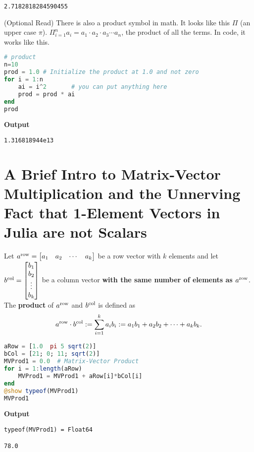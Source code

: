 \begin{tcolorbox}[title=\textbf{The summation symbol is a for loop and vice versa}]
\begin{itemize}
\begin{verbatim}
2.7182818284590455
\end{verbatim}
  
    
\end{itemize}

\end{tcolorbox} 

\begin{rem} (Optional Read) There is also a product symbol in math. It looks like this $\Pi$ (an upper case $\pi$). $\Pi_{i=1}^{n} a_i = a_1 \cdot a_2 \cdot a_3 \cdots a_n$, the product of all the terms. In code, it works like this.\\

\begin{lstlisting}[language=Julia,style=mystyle]
# product
n=10
prod = 1.0 # Initialize the product at 1.0 and not zero
for i = 1:n
    ai = i^2       # you can put anything here
    prod = prod * ai 
end
prod
\end{lstlisting}
\textbf{Output} 
\begin{verbatim}
1.316818944e13
\end{verbatim}

\end{rem}

\section{A Brief Intro to Matrix-Vector Multiplication and the Unnerving Fact that 1-Element Vectors in Julia are not Scalars}

Let $a^{\rm row}=\begin{bmatrix} a_1 & a_2 & \cdots & a_k \end{bmatrix}$ be a row vector with $k$ elements and let $b^{\rm col}= \begin{bmatrix} b_1 \\b_2 \\ \vdots \\b_k \end{bmatrix}$ be a column vector \textbf{with the same number of elements as $a^{\rm row}$}. The \textbf{product} of $a^{\rm row}$ and $b^{\rm col}$ is defined as 
\begin{equation}
\label{eq:VectorProductFormula}
    a^{\rm row} \cdot b^{\rm col}:= \sum_{i=1}^k a_i b_i := a_1 b_1 + a_2 b_2 + \cdots + a_k b_k.
\end{equation}


\begin{lstlisting}[language=Julia,style=mystyle]
aRow = [1.0  pi 5 sqrt(2)]
bCol = [21; 0; 11; sqrt(2)]
MVProd1 = 0.0  # Matrix-Vector Product 
for i = 1:length(aRow)
    MVProd1 = MVProd1 + aRow[i]*bCol[i]
end
@show typeof(MVProd1)
MVProd1
\end{lstlisting}
\textbf{Output} 
\begin{verbatim}
typeof(MVProd1) = Float64

78.0
\end{verbatim}

